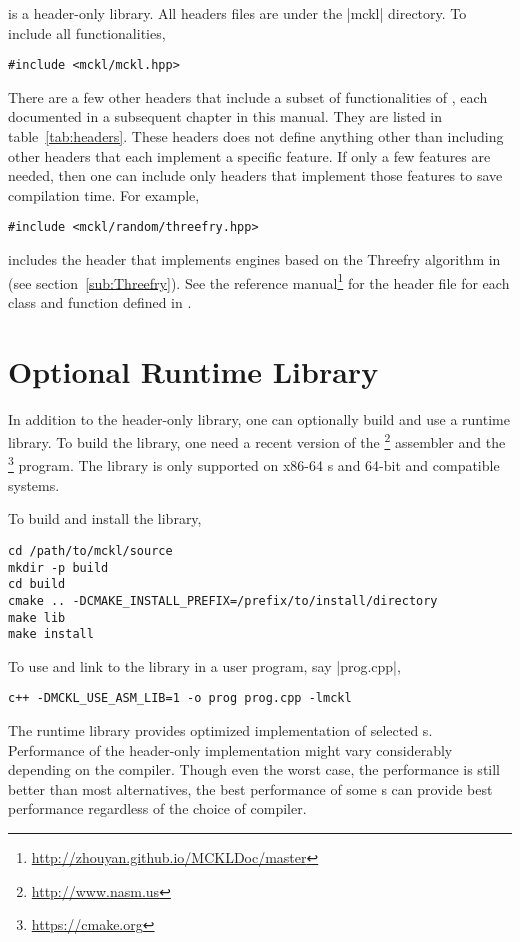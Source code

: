 \mckl is a header-only library. All headers files are under the |mckl|
directory. To include all functionalities,
\begin{verbatim}
#include <mckl/mckl.hpp>
\end{verbatim}
There are a few other headers that include a subset of functionalities of
\mckl, each documented in a subsequent chapter in this manual. They are listed
in table~\ref{tab:headers}. These headers does not define anything other than
including other headers that each implement a specific feature. If only a few
features are needed, then one can include only headers that implement those
features to save compilation time. For example,
\begin{verbatim}
#include <mckl/random/threefry.hpp>
\end{verbatim}
includes the header that implements \rng engines based on the Threefry
algorithm in~\cite{Salmon:2011um} (see section~\ref{sub:Threefry}). See the
reference manual\footnote{\url{http://zhouyan.github.io/MCKLDoc/master}} for
the header file for each class and function defined in \mckl.

\section{Optional Runtime Library}
\label{sec:Optional Runtime Library}

In addition to the header-only library, one can optionally build and use a
runtime library. To build the library, one need a recent version of the
\nasm\footnote{\url{http://www.nasm.us}} assembler and the
\cmake\footnote{\url{https://cmake.org}} program. The library is only supported
on x86-64 \cpu{}s and 64-bit \unix and compatible systems.

To build and install the library,
\begin{verbatim}
cd /path/to/mckl/source
mkdir -p build
cd build
cmake .. -DCMAKE_INSTALL_PREFIX=/prefix/to/install/directory
make lib
make install
\end{verbatim}
To use and link to the library in a user program, say |prog.cpp|,
\begin{verbatim}
c++ -DMCKL_USE_ASM_LIB=1 -o prog prog.cpp -lmckl
\end{verbatim}

The runtime library provides optimized implementation of selected \rng{}s.
Performance of the header-only implementation might vary considerably depending
on the compiler. Though even the worst case, the performance is still better
than most alternatives, the best performance of some \rng{}s can provide best
performance regardless of the choice of compiler.

